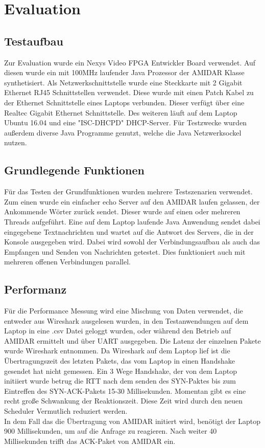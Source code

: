 \chapter{Evaluation}


\section{Testaufbau}

Zur Evaluation wurde ein Nexys Video FPGA Entwickler Board verwendet. Auf diesen wurde ein mit 100MHz laufender Java Prozessor der AMIDAR Klasse synthetisiert. Als Netzwerkschnittstelle wurde eine Steckkarte mit 2 Gigabit Ethernet RJ45 Schnittstellen verwendet. Diese wurde mit einen Patch Kabel zu der Ethernet Schnittstelle eines Laptops verbunden. Dieser verfügt über eine Realtec Gigabit Ethernet Schnittstelle. Des weiteren läuft auf dem Laptop Ubuntu 16.04 und eine "{}ISC-DHCPD"{} DHCP-Server. Für Testzwecke wurden außerdem diverse Java Programme genutzt, welche die Java Netzwerksockel nutzen. 

\section{Grundlegende Funktionen}

Für das Testen der Grundfunktionen wurden mehrere Testszenarien verwendet. Zum einen wurde ein einfacher echo Server auf den AMIDAR laufen gelassen, der Ankommende Wörter zurück sendet. Dieser wurde auf einen oder mehreren Threads aufgeführt. Eine auf dem Laptop laufende Java Anwendung sendet dabei eingegebene Textnachrichten und wartet auf die Antwort des Servers, die in der Konsole ausgegeben wird. Dabei wird sowohl der Verbindungsaufbau als auch das Empfangen und Senden von Nachrichten getestet. Dies funktioniert auch mit mehreren offenen Verbindungen parallel. 



\section{Performanz}
Für die Performance Messung wird eine Mischung von Daten verwendet, die entweder aus Wireshark ausgelesen wurden, in den Testanwendungen auf dem Laptop in eine .csv Datei geloggt wurden, oder während den Betrieb auf AMIDAR ermittelt und über UART ausgegeben. 
Die Latenz der einzelnen Pakete wurde Wireshark entnommen. Da Wireshark auf dem Laptop lief ist die Übertragungszeit des letzten Pakets, das vom Laptop in einen Handshake gesendet hat nicht gemessen. 
Ein 3 Wege Handshake, der von dem Laptop initiiert wurde betrug die RTT nach dem senden des SYN-Paktes bis zum Eintreffen des SYN-ACK-Pakets 15-30 Millisekunden. Momentan gibt es eine recht große Schwankung der Reaktionszeit. Diese Zeit wird durch den neuen Scheduler Vermutlich reduziert werden.\\
In dem Fall das die Übertragung von AMIDAR initiert wird, benötigt der Laptop 900 Millisekunden, um auf die Anfrage zu reagieren. Nach weiter 40 Millisekunden trifft das ACK-Paket von AMIDAR ein.\\

